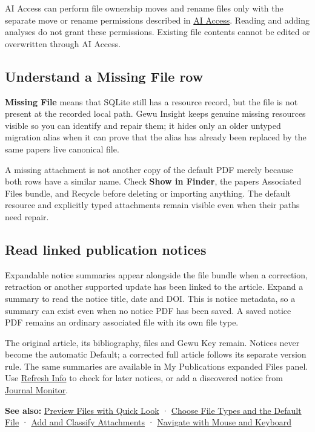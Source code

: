 \documentclass[10pt,letterpaper,oneside]{scrreprt}
\newenvironment{GewuRelated}{\par\nobreak\vspace{3pt}\nobreak\begingroup\small\sffamily\begin{samepage}\noindent}{\par\end{samepage}\endgroup}
\begin{document}
AI Access can perform file ownership moves and rename files only with the separate move or rename permissions described in \hyperref[ai-access]{AI Access}. Reading and adding analyses do not grant these permissions. Existing file contents cannot be edited or overwritten through AI Access.

\subsection{Understand a Missing File row}\label{understand-a-missing-file-row}

\textbf{Missing File} means that SQLite still has a resource record, but the file is not present at the recorded local path. Gewu Insight keeps genuine missing resources visible so you can identify and repair them; it hides only an older untyped migration alias when it can prove that the alias has already been replaced by the same paper\textquotesingle s live canonical file.

A missing attachment is not another copy of the default PDF merely because both rows have a similar name. Check \textbf{Show in Finder}, the paper\textquotesingle s Associated Files bundle, and Recycle before deleting or importing anything. The default resource and explicitly typed attachments remain visible even when their paths need repair.

\subsection{Read linked publication notices}\label{read-linked-publication-notices}

Expandable notice summaries appear alongside the file bundle when a correction, retraction or another supported update has been linked to the article. Expand a summary to read the notice title, date and DOI. This is notice metadata, so a summary can exist even when no notice PDF has been saved. A saved notice PDF remains an ordinary associated file with its own file type.

The original article, its bibliography, files and Gewu Key remain. Notices never become the automatic Default; a corrected full article follows its separate version rule. The same summaries are available in My Publications\textquotesingle{} expanded Files panel. Use \hyperref[paper-publication-updates]{Refresh Info} to check for later notices, or add a discovered notice from \hyperref[monitor-publication-updates]{Journal Monitor}.

\begin{GewuRelated}
\textbf{See also:} \hyperref[quick-look]{Preview Files with Quick Look} · \hyperref[versions-current]{Choose File Types and the Default File} · \hyperref[attachments]{Add and Classify Attachments} · \hyperref[navigation]{Navigate with Mouse and Keyboard}
\end{GewuRelated}
\end{document}
